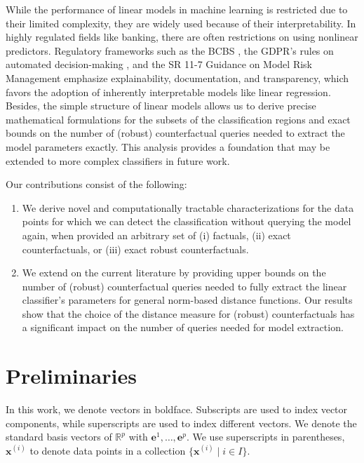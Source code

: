 \documentclass{article}
\begin{document}
While the performance of linear models in machine learning is restricted due to their limited complexity, they are widely used because of their interpretability. In highly regulated fields like banking, there are often restrictions on using nonlinear predictors. Regulatory frameworks such as the BCBS \citep{BCBS}, the GDPR’s rules on automated decision-making \citep{GDPR}, and the SR 11-7 Guidance on Model Risk Management \citep{Fed117} emphasize explainability, documentation, and transparency, which favors the adoption of inherently interpretable models like linear regression. Besides, the simple structure of linear models allows us to derive precise mathematical formulations for the subsets of the classification regions and exact bounds on the number of (robust) counterfactual queries needed to extract the model parameters exactly. This analysis provides a foundation that may be extended to more complex classifiers in future work.

Our contributions consist of the following:
\begin{enumerate}
    \item We derive novel and computationally tractable characterizations for the data points for which we can detect the classification without querying the model again, when provided an arbitrary set of (i) factuals, (ii) exact counterfactuals, or (iii) exact robust counterfactuals.
    \item We extend on the current literature by providing upper bounds on the number of (robust) counterfactual queries needed to fully extract the linear classifier's parameters for general norm-based distance functions. Our results show that the choice of the distance measure for (robust) counterfactuals has a significant impact on the number of queries needed for model extraction.
\end{enumerate}

\section{Preliminaries}
In this work, we denote vectors in boldface. Subscripts are used to index vector components, while superscripts are used to index different vectors. We denote the standard basis vectors of $\mathbb{R}^p$ with $\bm{e}^1,\hdots,\bm{e}^p$. We use superscripts in parentheses, $\bm{x}^{(i)}$ to denote data points in a collection $\{\bm{x}^{(i)}\mid i\in I\}$.
\end{document}

